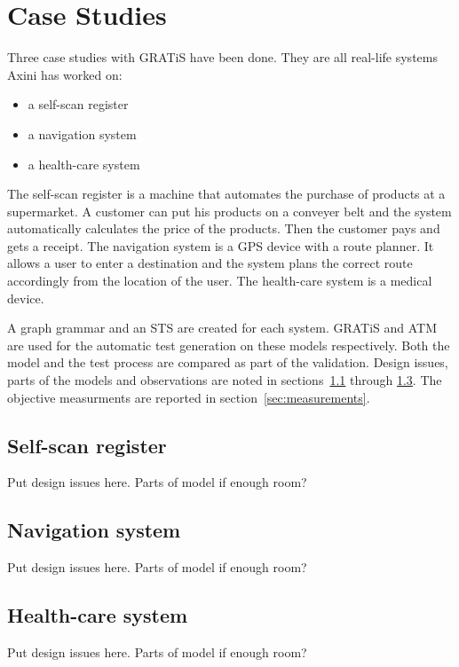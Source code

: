 \section{Case Studies}\label{sec:case-studies}

Three case studies with GRATiS have been done. They are all real-life systems Axini has worked on:
\begin{itemize}
  \item a self-scan register
  \item a navigation system
  \item a health-care system
\end{itemize}  

The self-scan register is a machine that automates the purchase of products at a supermarket. A customer can put his products on a conveyer belt and the system automatically calculates the price of the products. Then the customer pays and gets a receipt. The navigation system is a GPS device with a route planner. It allows a user to enter a destination and the system plans the correct route accordingly from the location of the user. The health-care system is a medical device.

A graph grammar and an STS are created for each system. GRATiS and ATM are used for the automatic test generation on these models respectively. Both the model and the test process are compared as part of the validation. Design issues, parts of the models and observations are noted in sections~\ref{sec:self-scan} through \ref{sec:health-care}. The objective measurments are reported in section~\ref{sec:measurements}.

\subsection{Self-scan register}\label{sec:self-scan}
Put design issues here. Parts of model if enough room?

\subsection{Navigation system}\label{sec:navigation}
Put design issues here. Parts of model if enough room?

\subsection{Health-care system}\label{sec:health-care}
Put design issues here. Parts of model if enough room?

